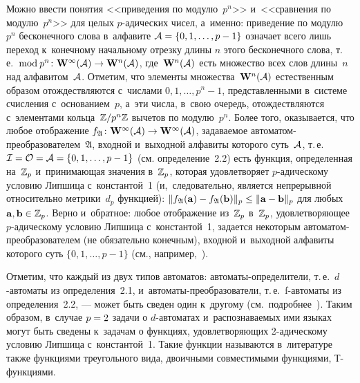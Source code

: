 \begin{multicols}{2}
Можно ввести понятия <<приведения
по модулю~$p^n$>>  и~<<сравнения по модулю~$p^n$>> для целых $p$-ади\-че\-ских
 чисел, а~именно:
приведение по модулю~$p^n$ бесконечного слова в~алфавите $\Cal A\hm=\{0,1,\ldots,p-1\}$
означает всего лишь переход к~конечному начальному отрезку длины $n$ этого
бесконечного слова, т.\,е.\ $\bmod \,p^n\colon \mathbf W^\infty (\Cal A)\hm\to \mathbf
W^n(\Cal A)$, где~$\mathbf W^n(\mathcal A)$ есть множество всех слов длины~$n$
над алфавитом~$\mathcal A$. Отметим, что элементы множества~$\mathbf W^n(\mathcal A)$ естественным образом отождествляются с~числами $0,1,\ldots,p^n-1$, представленными
в~системе счисления с~основанием~$p$, а~эти числа, в~свою очередь, отождествляются
с~элементами кольца~$\mathbb{Z}/p^n\mathbb{Z}$ вычетов по модулю~$p^n$.
Более того, оказывается,
что любое отображение  $f_\mathfrak A\colon\mathbf W^\infty(\Cal A)
\hm\to\mathbf W^\infty(\Cal A)$, задаваемое ав\-то\-ма\-том-пре\-об\-ра\-зо\-ва\-те\-лем~$\mathfrak A$, 
входной и~выходной алфавиты которого суть~$\mathcal A$, т.\,е.\
 $\Cal I\hm=\Cal O\hm=\Cal A\hm=\{0,1,\ldots,p-1\}$ (см. определение~2.2)
есть функция, определенная  на~$\mathbb{Z}_p$ и~при\-ни\-ма\-ющая значения в~$\mathbb{Z}_p$, 
которая удовлетворяет
$p$-ади\-че\-ско\-му условию Липшица с~константой~1 
(и,~следовательно, является непрерывной
относительно мет\-ри\-ки~$d_p$ функцией):
$\|f_\mathfrak A(\mathbf a)\hm-f_\mathfrak A(\mathbf b)\|_p\hm\le\|\mathbf a 
\hm-\mathbf b\|_p$
для любых $\mathbf a, \mathbf b \hm\in\Z_p$. Верно и~обратное: любое отображение
из~$\mathbb{Z}_p$ в~$\mathbb{Z}_p$, удовлетворяющее $p$-ади\-че\-ско\-му условию Липшица с~константой~1, 
задается некоторым ав\-то\-ма\-том-пре\-об\-ра\-зо\-ва\-те\-лем 
(не обязательно конечным), входной и~выходной алфавиты
которого суть $\{0,1,\ldots,p-1\}$ (см., например,~\cite{me:Discr_Syst}).
{\looseness=1

}

Отметим, что  каждый из двух типов автоматов: ав\-то\-ма\-ты-оп\-ре\-де\-ли\-те\-ли, 
т.\,е.\ $d$-ав\-то\-ма\-ты из определения~2.1,
и~ав\-то\-ма\-ты-пре\-об\-ра\-зо\-ва\-те\-ли, т.\,е.\
 f-ав\-то\-ма\-ты из определения~2.2, ---
может быть  сведен один к~другому
(см.\ подробнее~\cite[теорема~4.3.2]{Allouche-Shall}).
Таким образом,  в~случае $p\hm=2$ задачи о $d$-ав\-то\-ма\-тах и~распознаваемых
ими языках могут быть сведены к~задачам о функциях, удовлетворяющих 2-ади\-че\-ско\-му
условию Липшица с~константой~1.  Такие функции
называются в~литературе также функциями треугольного
вида, двоичными совместимыми функциями, Т-функ\-ци\-ями. 


\end{multicols}
